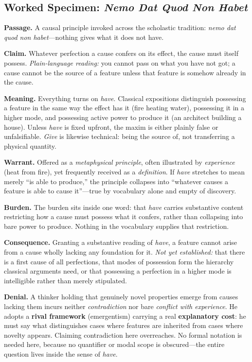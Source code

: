 \subsection*{Worked Specimen: \emph{Nemo Dat Quod Non Habet}}

\textbf{Passage.} A causal principle invoked across the scholastic tradition: \emph{nemo dat quod non habet}---nothing gives what it does not have.

\textbf{Claim.} Whatever perfection a cause confers on its effect, the cause must itself possess. \emph{Plain-language reading:} you cannot pass on what you have not got; a cause cannot be the source of a feature unless that feature is somehow already in the cause.

\textbf{Meaning.} Everything turns on \emph{have}. Classical expositions distinguish possessing a feature in the same way the effect has it (fire heating water), possessing it in a higher mode, and possessing active power to produce it (an architect building a house). Unless \emph{have} is fixed upfront, the maxim is either plainly false or unfalsifiable. \emph{Give} is likewise technical: being the source of, not transferring a physical quantity.

\textbf{Warrant.} Offered as a \emph{metaphysical principle}, often illustrated by \emph{experience} (heat from fire), yet frequently received as a \emph{definition}. If \emph{have} stretches to mean merely ``is able to produce,'' the principle collapses into ``whatever causes a feature is able to cause it''---true by vocabulary alone and empty of discovery.

\textbf{Burden.} The burden sits inside one word: that \emph{have} carries substantive content restricting how a cause must possess what it confers, rather than collapsing into bare power to produce. Nothing in the vocabulary supplies that restriction.

\textbf{Consequence.} Granting a substantive reading of \emph{have}, a feature cannot arise from a cause wholly lacking any foundation for it. \emph{Not yet established:} that there is a first cause of all perfections, that modes of possession form the hierarchy classical arguments need, or that possessing a perfection in a higher mode is intelligible rather than merely stipulated.

\textbf{Denial.} A thinker holding that genuinely novel properties emerge from causes lacking them incurs neither \emph{contradiction} nor bare \emph{conflict with experience}. He adopts a \textbf{rival framework} (emergentism) carrying a real \textbf{explanatory cost}: he must say what distinguishes cases where features are inherited from cases where novelty appears. Claiming contradiction here overreaches. No formal notation is needed here, because no quantifier or modal scope is obscured---the entire question lives inside the sense of \emph{have}.
